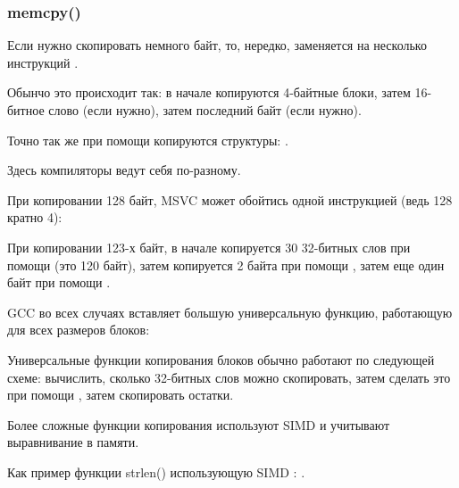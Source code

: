 \subsubsection{memcpy()}

\label{copying_short_blocks}

Если нужно скопировать немного байт, то, нередко, 
 заменяется на несколько инструкций \MOV.








Обынчо это происходит так: в начале копируются 4-байтные блоки, затем 16-битное слово (если нужно), 
затем последний байт (если нужно).


Точно так же при помощи \MOV копируются структуры: .


Здесь компиляторы ведут себя по-разному.



При копировании 128 байт, MSVC может обойтись одной инструкцией  (ведь 128 кратно 4):




При копировании 123-х байт, в начале копируется 30 32-битных слов при помощи  
(это 120 байт), 
затем копируется 2 байта при помощи , 
затем еще один байт при помощи .




GCC во всех случаях вставляет большую универсальную функцию, работающую для всех размеров блоков:




Универсальные функции копирования блоков обычно работают по следующей схеме: 
вычислить, сколько 32-битных слов
можно скопировать, затем сделать это при помощи , затем скопировать остатки.


Более сложные функции копирования используют \ac{SIMD} и учитывают выравнивание в памяти.

Как пример функции strlen() использующую SIMD
: .

